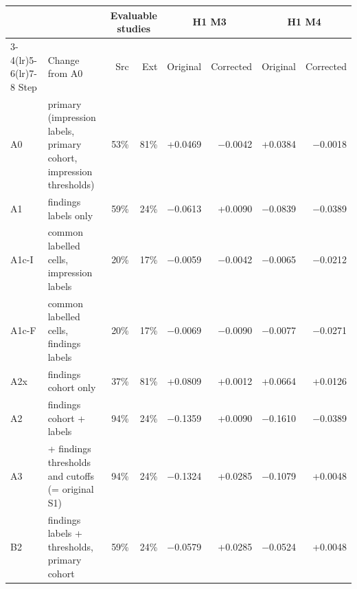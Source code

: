 \begin{tabular}{llrrrrrr}
\toprule
 & & \multicolumn{2}{c}{Evaluable studies} & \multicolumn{2}{c}{H1 M3} & \multicolumn{2}{c}{H1 M4}\\
\cmidrule(lr){3-4}\cmidrule(lr){5-6}\cmidrule(lr){7-8}
Step & Change from A0 & Src & Ext & Original & Corrected & Original & Corrected\\
\midrule
A0 & primary (impression labels, primary cohort, impression thresholds) & 53\% & 81\% & +0.0469 & $-$0.0042 & +0.0384 & $-$0.0018\\
A1 & findings labels only & 59\% & 24\% & $-$0.0613 & +0.0090 & $-$0.0839 & $-$0.0389\\
A1c-I & common labelled cells, impression labels & 20\% & 17\% & $-$0.0059 & $-$0.0042 & $-$0.0065 & $-$0.0212\\
A1c-F & common labelled cells, findings labels & 20\% & 17\% & $-$0.0069 & $-$0.0090 & $-$0.0077 & $-$0.0271\\
A2x & findings cohort only & 37\% & 81\% & +0.0809 & +0.0012 & +0.0664 & +0.0126\\
A2 & findings cohort + labels & 94\% & 24\% & $-$0.1359 & +0.0090 & $-$0.1610 & $-$0.0389\\
A3 & + findings thresholds and cutoffs (= original S1) & 94\% & 24\% & $-$0.1324 & +0.0285 & $-$0.1079 & +0.0048\\
B2 & findings labels + thresholds, primary cohort & 59\% & 24\% & $-$0.0579 & +0.0285 & $-$0.0524 & +0.0048\\
\bottomrule
\end{tabular}
